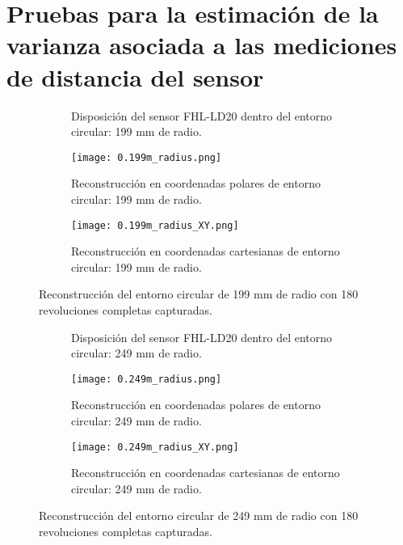 \section{Pruebas para la estimación de la varianza asociada a las mediciones de distancia del sensor}
\label{varianza_distancia}
\begin{figure}[H]
	\centering
	\begin{subfigure}{\textwidth}
		\centering
		\caption{Disposición del sensor FHL-LD20 dentro del entorno circular: 199 mm de radio.}
		\label{fig:disposicion_lidar_var2}
		\vspace{1em}
	\end{subfigure}
	\begin{subfigure}{0.45\textwidth}
		\centering
		\texttt{[image: 0.199m\_radius.png]}
		\caption{Reconstrucción en coordenadas polares de entorno circular: 199 mm de radio.}
		\label{fig:199m_radius_xy}
	\end{subfigure}
	\hspace{1em}
	\begin{subfigure}{0.45\textwidth}
		\centering
		\texttt{[image: 0.199m\_radius\_XY.png]}
		\caption{Reconstrucción en coordenadas cartesianas de entorno circular: 199 mm de radio.}
		\label{fig:199m_radius}
	\end{subfigure}
	\caption{Reconstrucción del entorno circular de 199 mm de radio con 180 revoluciones completas capturadas.}
	\label{fig:disposicion_lidar_var_dist2}
\end{figure}

\begin{figure}[H]
	\centering
	\begin{subfigure}{\textwidth}
		\centering
		\caption{Disposición del sensor FHL-LD20 dentro del entorno circular: 249 mm de radio.}
		\label{fig:disposicion_lidar_var3}
		\vspace{1em}
	\end{subfigure}
	\begin{subfigure}{0.45\textwidth}
		\centering
		\texttt{[image: 0.249m\_radius.png]}
		\caption{Reconstrucción en coordenadas polares de entorno circular: 249 mm de radio.}
		\label{fig:249m_radius_xy}
	\end{subfigure}
	\hspace{1em}
	\begin{subfigure}{0.45\textwidth}
		\centering
		\texttt{[image: 0.249m\_radius\_XY.png]}
		\caption{Reconstrucción en coordenadas cartesianas de entorno circular: 249 mm de radio.}
		\label{fig:249m_radius}
	\end{subfigure}
	\caption{Reconstrucción del entorno circular de 249 mm de radio con 180 revoluciones completas capturadas.}
	\label{fig:disposicion_lidar_var_dist3}
\end{figure}

